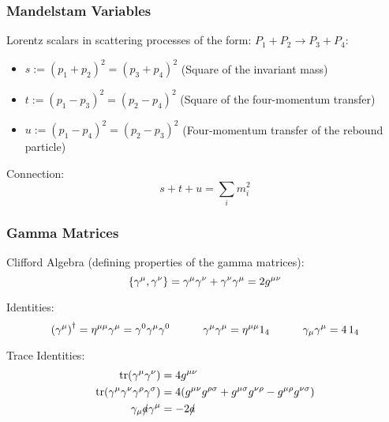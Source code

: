 			\subsubsection{Mandelstam Variables}
				\noindent
				Lorentz scalars in scattering processes of the form: $P_1 + P_2 \rightarrow P_3 + P_4$:
				\begin{itemize}\itemsep -0pt	%
					\item $s:=(p_1+p_2)^2=(p_3+p_4)^2$ \hfill{(Square of the invariant mass)}
					\item $t:=(p_1-p_3)^2=(p_2-p_4)^2$ \hfill{(Square of the four-momentum transfer)}
					\item $u:=(p_1-p_4)^2=(p_2-p_3)^2$ \hfill{(Four-momentum transfer of the rebound particle)}
				\end{itemize}
	
				\noindent
				Connection:
				\begin{equation}
					s+t+u = \sum_i m_i^2
				\end{equation}

		\subsubsection{Gamma Matrices}
			\noindent
			Clifford Algebra (defining properties of the gamma matrices):
			\begin{equation}
				\acomm{\gamma^\mu}{\gamma^\nu} = \gamma^\mu \gamma^\nu + \gamma^\nu \gamma^\mu = 2g^{\mu\nu}
			\end{equation}

			\noindent
			Identities:
			\begin{equation}
				\qty(\gamma^\mu)^\dagger = \eta^{\mu\mu} \gamma^\mu = \gamma^0 \gamma^\mu \gamma^0
				\hspace{30pt} \gamma^\mu \gamma^\mu = \eta^{\mu\mu} 1_4
				\hspace{30pt} \gamma_\mu \gamma^\mu = 4 \,1_4
			\end{equation}

			\noindent
			Trace Identities:
			\begin{equation}
				\begin{aligned}
					\tr(\gamma^\mu \gamma^\nu) &= 4 g^{\mu\nu} \\
					\tr(\gamma^\mu \gamma^\nu \gamma^\rho \gamma^\sigma) &= 4 \qty(g^{\mu\nu}g^{\rho\sigma} + g^{\mu\sigma}g^{\nu\rho} - g^{\mu\rho}g^{\nu\sigma}) \\
					\gamma_\mu \slashed{a} \gamma^\mu &= -2 \slashed{a} \\
				\end{aligned}
			\end{equation}


